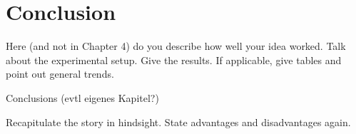 





\chapter{Conclusion}

Here (and not in Chapter 4) do you describe how well your idea
worked. Talk about the experimental setup. Give the results. If
applicable, give tables and point out general trends.

Conclusions (evtl eigenes Kapitel?)

Recapitulate the story in hindsight. State advantages and
disadvantages again.



